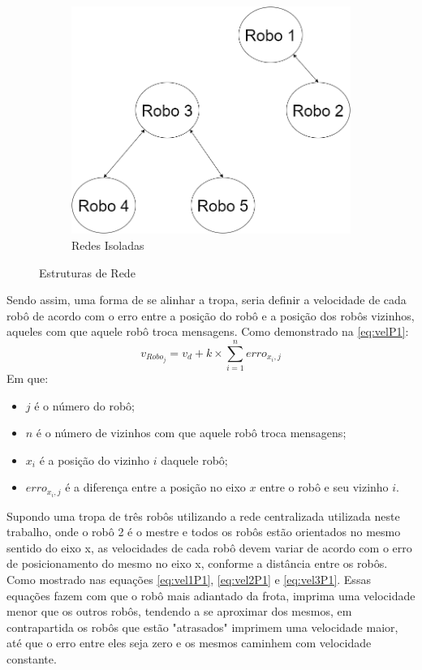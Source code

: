 \begin{figure}
\begin{subfigure}{.45\textwidth}
		\centering
		\includegraphics[width=.9\linewidth]{./04-figuras/RedeIsolada}
		\caption{Redes Isoladas}
		\label{fig:redeisolada}
	\end{subfigure}
	\caption{Estruturas de Rede}
	\label{fig:redes}
\end{figure}

Sendo assim, uma forma de se alinhar a tropa, seria definir a velocidade de cada robô de acordo com o erro entre a posição do robô e a posição dos robôs vizinhos, aqueles com que aquele robô troca mensagens. Como demonstrado na \autoref{eq:velP1}:
\begin{equation}
v_{Robo_j} = v_{d} + k \times \sum\limits_{i = 1}^{n} erro_{x_{i},j}
\label{eq:velP1}
\end{equation}
Em que:
\begin{itemize}
	\item $j$ é o número do robô;
	\item $n$ é o número de vizinhos com que aquele robô troca mensagens;
	\item $x_{i}$ é a posição do vizinho $i$ daquele robô;
	\item $erro_{x_{i},j}$ é a diferença entre a posição no eixo $x$ entre o robô e seu vizinho $i$.
\end{itemize}

Supondo uma tropa de três robôs utilizando a rede centralizada utilizada neste trabalho, onde o robô 2 é o mestre e todos os robôs estão orientados no mesmo sentido do eixo x, as velocidades de cada robô devem variar de acordo com o erro de posicionamento do mesmo no eixo x, conforme a distância entre os robôs. Como mostrado nas  equações \ref{eq:vel1P1}, \ref{eq:vel2P1} e \ref{eq:vel3P1}. Essas equações fazem com que o robô mais adiantado da frota, imprima uma velocidade menor que os outros robôs, tendendo a se aproximar dos mesmos, em contrapartida os robôs que estão "atrasados" imprimem uma velocidade maior, até que o erro entre eles seja zero e os mesmos caminhem com velocidade constante. 

